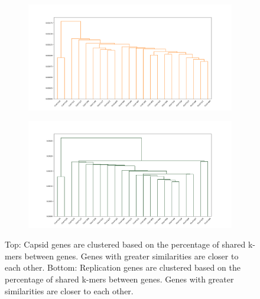 \documentclass[eng]{ajceam-class}
\begin{document}
\begin{figure}
    \centering
    \begin{subfigure}[h]{0.5\textwidth}
        \includegraphics[width=\linewidth]{PairwiseCPDendrogram.png}
    \end{subfigure}
    \hfill
    \begin{subfigure}[h]{0.5\textwidth}
        \includegraphics[width=\linewidth]{PairwiseRepDendrogram.png}
    \end{subfigure}
    \caption{Top: Capsid genes are clustered based on the percentage of shared k-mers between genes. Genes with greater similarities are closer to each other. Bottom: Replication genes are clustered based on the percentage of shared k-mers between genes. Genes with greater similarities are closer to each other.}
\end{figure}
\end{document}
